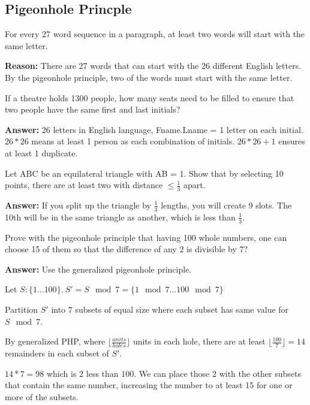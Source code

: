 \documentclass[landscape, letterpaper, 8pt]{extarticle}
\begin{document}
\begin{multicols}{3}
    \subsection*{Pigeonhole Princple}
    \begin{example}
        For every 27 word sequence in a paragraph, at least two words will start with the same letter.

        \textbf{Reason: } There are 27 words that can start with the 26 different English letters. By the pigeonhole principle, two of the words must start with the same letter.
    \end{example}
    \begin{example}
        If a theatre holds 1300 people, how many seats need to be filled to ensure that two people have the same first and last initials?

        \textbf{Answer: } 26 letters in English language, Fname.Lname = 1 letter on each initial. $26 * 26$ means at least 1 person as each combination of initials. $26 * 26 +1$ ensures at least 1 duplicate.
    \end{example}
    \begin{example}
        Let ABC be an equilateral triangle with AB = 1. Show that by selecting 10 points, there are at least two with distance $\leq \frac{1}{3}$ apart.

        \textbf{Answer: } If you split up the triangle by $\frac{1}{3}$ lengths, you will create 9 slots. The 10th will be in the same triangle as another, which is less than $\frac{1}{3}$.
    \end{example}
    \begin{example}
        Prove with the pigeonhole principle that having 100 whole numbers, one can choose 15 of them so that the difference of any 2 is divisible by 7?

        \textbf{Answer: } Use the generalized pigeonhole principle.

        Let $S: \{1\ldots100\}.~S' = S \mod 7 = \{1 \mod 7 \ldots 100 \mod 7\}$

        Partition $S'$ into $7$ subsets of equal size where each subset has same value for $S \mod 7$.

        By generalized PHP, where $\lfloor \frac{units}{holes}\rfloor$ units in each hole, there are at least $\lfloor \frac{100}{7} \rfloor = 14$ remainders in each subset of $S'$.

        $14 * 7 = 98$ which is $2$ less than $100$. We can place those $2$ with the other subsets that contain the same number, increasing the number to at least 15 for one or more of the subsets.

    \end{example}
\end{multicols}
\end{document}
